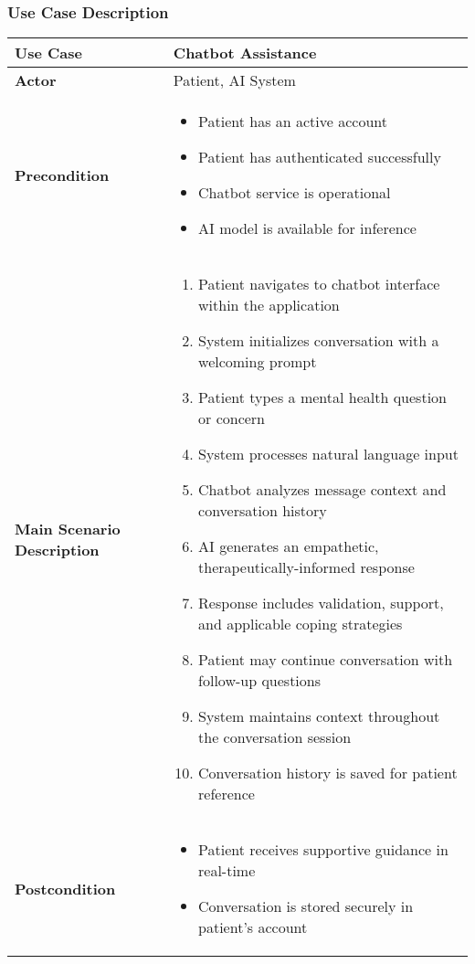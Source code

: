 \subsubsection{Use Case Description}
\begin{table}[h]
\centering
\begin{tabular}{|p{3cm}|p{10cm}|}
\hline
\textbf{Use Case} & Chatbot Assistance \\
\hline
\textbf{Actor} & Patient, AI System \\
\hline
\textbf{Precondition} & 
\begin{itemize}
    \item Patient has an active account
    \item Patient has authenticated successfully
    \item Chatbot service is operational
    \item AI model is available for inference
\end{itemize} \\
\hline
\textbf{Main Scenario Description} & 
\begin{enumerate}
    \item Patient navigates to chatbot interface within the application
    \item System initializes conversation with a welcoming prompt
    \item Patient types a mental health question or concern
    \item System processes natural language input
    \item Chatbot analyzes message context and conversation history
    \item AI generates an empathetic, therapeutically-informed response
    \item Response includes validation, support, and applicable coping strategies
    \item Patient may continue conversation with follow-up questions
    \item System maintains context throughout the conversation session
    \item Conversation history is saved for patient reference
\end{enumerate} \\
\hline
\textbf{Postcondition} & 
\begin{itemize}
    \item Patient receives supportive guidance in real-time
    \item Conversation is stored securely in patient's account

\end{itemize}
\end{tabular}
\end{table}
